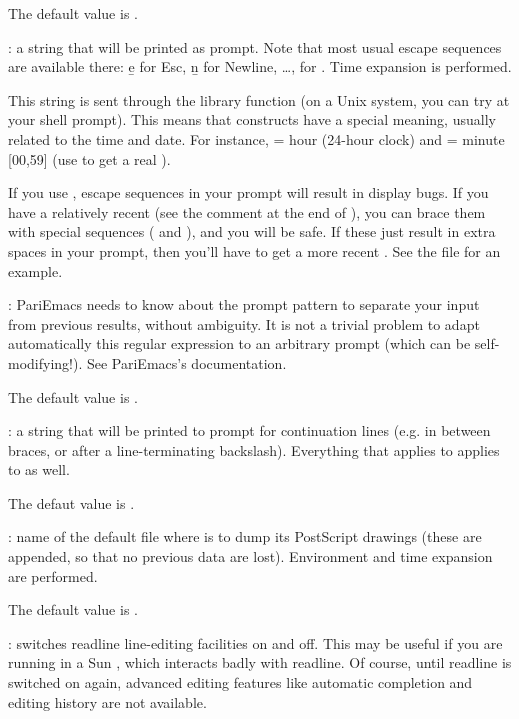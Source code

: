 The default value is .

: \label{se:def,prompt}a string that will be printed as
prompt. Note that most usual escape sequences are available there: \b{e} for
Esc, \b{n} for Newline, \dots, \kbd{\bs\bs} for \kbd{\bs}. Time expansion is
performed.

This string is sent through the library function  (on a
Unix system, you can try  at your shell prompt). This means
that \kbd{\%} constructs have a special meaning, usually related to the time
and date. For instance,  = hour (24-hour clock) and  =
minute [00,59] (use \kbd{\%\%} to get a real \kbd{\%}).

If you use , escape sequences in your prompt will result in
display bugs. If you have a relatively recent  (see the comment
at the end of ), you can brace them with special sequences
(\kbd{\bs[} and \kbd{\bs]}), and you will be safe. If these just result in
extra spaces in your prompt, then you'll have to get a more recent
. See the file  for an example.

: PariEmacs needs to know about the prompt pattern to
separate your input from previous  results, without ambiguity. It is
not a trivial problem to adapt automatically this regular expression to an
arbitrary prompt (which can be self-modifying!). See PariEmacs's
documentation.

The default value is .

: \label{se:def,prompt_cont}a string that will be printed
to prompt for continuation lines (e.g. in between braces, or after a
line-terminating backslash). Everything that applies to 
applies to  as well.

The defaut value is .

: \label{se:def,psfile}name of the default file where
 is to dump its PostScript drawings (these are appended, so that no
previous data are lost). Environment and time expansion are performed.

The default value is .

: \label{se:def,readline}switches readline line-editing
facilities on and off. This may be useful if you are running  in a Sun
, which interacts badly with readline. Of course, until readline
is switched on again, advanced editing features like automatic completion
and editing history are not available.

